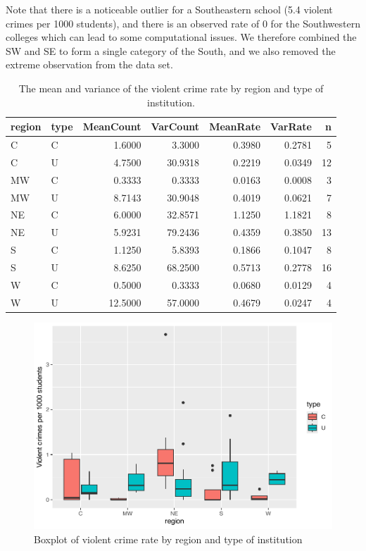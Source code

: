 \documentclass[
]{krantz}
\begin{document}
Note that there is a noticeable outlier for a Southeastern school (5.4 violent crimes per 1000 students), and there is an observed rate of 0 for the Southwestern colleges which can lead to some computational issues. We therefore combined the SW and SE to form a single category of the South, and we also removed the extreme observation from the data set.

\begin{table}

\caption{\label{tab:table4ch4}The mean and variance of the violent crime rate by region and type of institution.}
\centering
\begin{tabular}[t]{llrrrrr}
\toprule
region & type & MeanCount & VarCount & MeanRate & VarRate & n\\
\midrule
C & C & 1.6000 & 3.3000 & 0.3980 & 0.2781 & 5\\
C & U & 4.7500 & 30.9318 & 0.2219 & 0.0349 & 12\\
MW & C & 0.3333 & 0.3333 & 0.0163 & 0.0008 & 3\\
MW & U & 8.7143 & 30.9048 & 0.4019 & 0.0621 & 7\\
NE & C & 6.0000 & 32.8571 & 1.1250 & 1.1821 & 8\\
\addlinespace
NE & U & 5.9231 & 79.2436 & 0.4359 & 0.3850 & 13\\
S & C & 1.1250 & 5.8393 & 0.1866 & 0.1047 & 8\\
S & U & 8.6250 & 68.2500 & 0.5713 & 0.2778 & 16\\
W & C & 0.5000 & 0.3333 & 0.0680 & 0.0129 & 4\\
W & U & 12.5000 & 57.0000 & 0.4679 & 0.0247 & 4\\
\bottomrule
\end{tabular}
\end{table}

\begin{figure}

{\centering \includegraphics[width=0.6\linewidth]{bookdown-BeyondMLR_files/figure-latex/boxtyperegion-1} 

}

\caption{Boxplot of violent crime rate by region and type of institution}\label{fig:boxtyperegion}
\end{figure}
\end{document}
